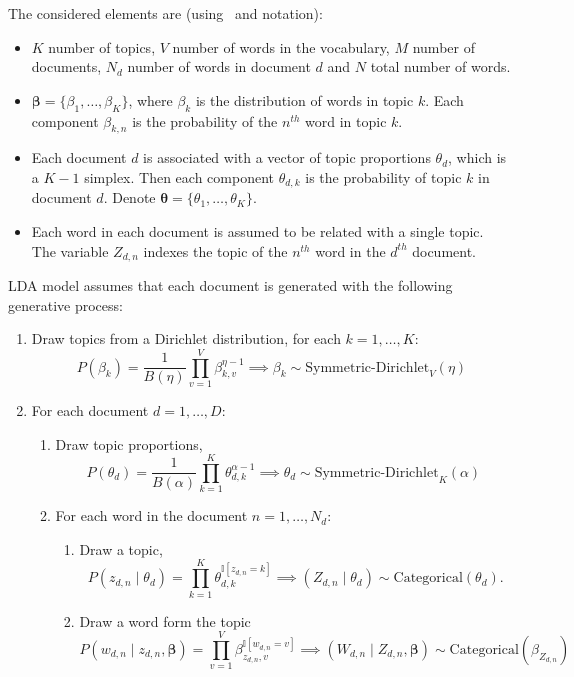 The considered elements are (using~\cite{hoffman2013stochastic} and \cite{blei2003latent} notation):
\begin{itemize}\setlength\itemsep{1em}
  \item \(K\) number of topics, \(V\) number of words in the vocabulary, \(M\) number of documents, \(N_{d}\) number of words in document \(d\) and \(N\) total number of words.
  \item \(\bm{\beta} = \{\beta_{1}, \dots, \beta_{K}\}\), where \(\beta_{k}\) is the distribution of words in topic \(k\). Each component \(\beta_{k,n}\) is the probability of the \(n^{th}\) word in topic \(k\).

  \item Each document \(d\) is associated with a vector of topic proportions \(\theta_{d}\), which is a \(K-1\) simplex. Then each component \(\theta_{d,k}\) is the probability of topic \(k\) in document \(d\). Denote \(\bm{\theta} = \{\theta_{1},\dots,\theta_{K}\}\).
  \item Each word in each document is assumed to be related with a single topic. The variable \(Z_{d,n}\) indexes the topic of the \(n^{th}\) word in the \(d^{th}\) document.
\end{itemize}

LDA model assumes that each document is generated with the following generative process:
\begin{enumerate}
  \item Draw topics from a Dirichlet distribution, for each \(k=1,\dots,K\):
    \[
    P(\beta_{k}) = \frac{1}{B(\eta)} \prod_{v=1}^{V}\beta_{k,v}^{\eta - 1} \implies \beta_{k} \sim \text{Symmetric-Dirichlet}_{V}(\eta)
    \]
  \item For each document \(d = 1,\dots,D\):
    \begin{enumerate}
      \item Draw topic proportions,
        \[
        P(\theta_{d}) = \frac{1}{B(\alpha)} \prod_{k=1}^{K}\theta_{d,k}^{\alpha-1} \implies \theta_{d} \sim \text{Symmetric-Dirichlet}_{K}(\alpha)
        \]
      \item For each word in the document \(n = 1,\dots,N_{d}\):
        \begin{enumerate}
          \item Draw  a topic,
            \[
            P(z_{d,n} \mid \theta_{d}) = \prod_{k=1}^{K}\theta_{d,k}^{\mathbb{I}[z_{d,n}=k]} \implies  (Z_{d,n} \mid \theta_{d}) \sim \text{Categorical}(\theta_d).
            \]
          \item Draw a word form the topic
            \[
            P(w_{d,n}\mid z_{d,n}, \bm{\beta}) = \prod_{v=1}^{V}\beta_{z_{d,n},v}^{\mathbb{I}[w_{d,n}=v]} \implies (W_{d,n} \mid Z_{d,n},\bm{\beta}) \sim \text{Categorical}(\beta_{Z_{d,n}})
            \]
        \end{enumerate}
    \end{enumerate}
\end{enumerate}

